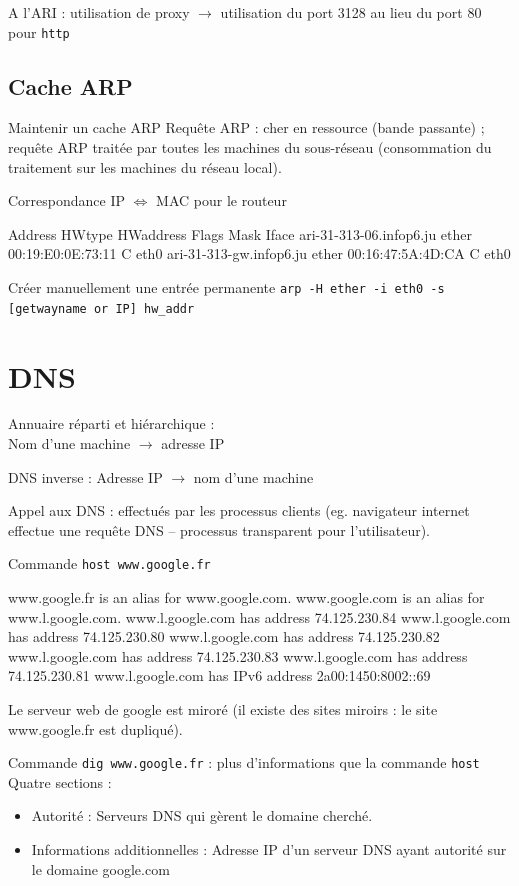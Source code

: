 \documentclass[11pt,english,french]{scrreprt}
\theoremstyle{remark}
\theoremstyle{definition}
\begin{document}
A l'ARI : utilisation de proxy $\rightarrow$ utilisation du port 3128 au lieu du port 80 pour \lstinline!http!

\subsection{Cache ARP}
Maintenir un cache ARP
Requête ARP : cher en ressource (bande passante) ; requête ARP traitée par toutes les machines du sous-réseau (consommation du traitement sur les machines du réseau local).

Correspondance IP $\Leftrightarrow$ MAC pour le routeur
\begin{verbatimtab}
Address                  HWtype  HWaddress           Flags Mask            Iface
ari-31-313-06.infop6.ju  ether   00:19:E0:0E:73:11   C                     eth0
ari-31-313-gw.infop6.ju  ether   00:16:47:5A:4D:CA   C                     eth0
\end{verbatimtab}

Créer manuellement une entrée permanente
\lstinline!arp -H ether -i eth0 -s [getwayname or IP] hw_addr!

\section{DNS}

Annuaire réparti et hiérarchique :\\
Nom d'une machine $\rightarrow$ adresse IP

DNS inverse : Adresse IP $\rightarrow$ nom d'une machine

Appel aux DNS : effectués par les processus clients (eg. navigateur internet effectue une requête DNS -- processus transparent pour l'utilisateur).

Commande \lstinline!host www.google.fr!

\begin{verbatimtab}
www.google.fr is an alias for www.google.com.
www.google.com is an alias for www.l.google.com.
www.l.google.com has address 74.125.230.84
www.l.google.com has address 74.125.230.80
www.l.google.com has address 74.125.230.82
www.l.google.com has address 74.125.230.83
www.l.google.com has address 74.125.230.81
www.l.google.com has IPv6 address 2a00:1450:8002::69
\end{verbatimtab}

Le serveur web de google est miroré (il existe des sites miroirs : le site www.google.fr est dupliqué).

Commande \lstinline!dig www.google.fr! : plus d'informations que la commande \lstinline!host!
Quatre sections :\begin{itemize}
	\item Autorité : Serveurs DNS qui gèrent le domaine cherché.
	\item Informations additionnelles : Adresse IP d'un serveur DNS ayant autorité sur le domaine google.com
\end{itemize}
\end{document}
